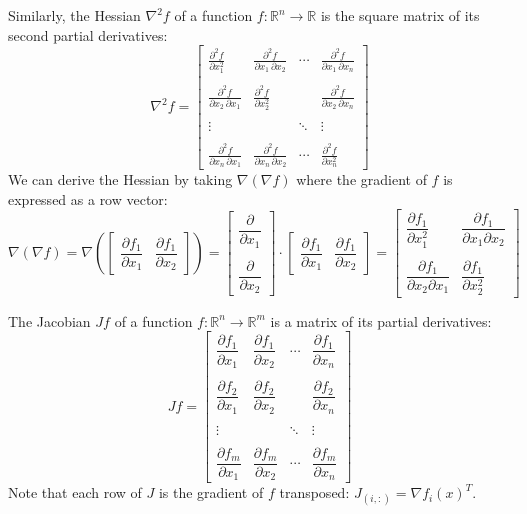 \documentclass{article}
\begin{document}
Similarly, the Hessian $\nabla ^2 f$ of a function $ f: \mathbb{R}^n \longrightarrow \mathbb{R} $
is the square matrix of its second partial derivatives:
\[
    \nabla ^2 f =
    \begin{bmatrix}
        \frac{\partial^2 f}{\partial x_1^2} & \frac{\partial^2 f}{\partial x_1\,\partial x_2} & \cdots & \frac{\partial^2 f}{\partial x_1\,\partial x_n} \\ \\
        \frac{\partial^2 f}{\partial x_2\,\partial x_1} & \frac{\partial^2 f}{\partial x_2^2} &  & \frac{\partial^2 f}{\partial x_2\,\partial x_n} \\ \\
        \vdots &   & \ddots & \vdots \\ \\
        \frac{\partial^2 f}{\partial x_n\,\partial x_1} & \frac{\partial^2 f}{\partial x_n\,\partial x_2} & \cdots & \frac{\partial^2 f}{\partial x_n^2}
    \end{bmatrix}
\]
We can derive the Hessian by taking $\nabla(\nabla f)$ where the gradient of $f$ is expressed as a row vector:
\[
    \nabla(\nabla f) = \nabla (
    \begin{bmatrix}
        \dfrac{\partial f_1}{\partial x_1} & \dfrac{\partial f_1}{\partial x_2}
    \end{bmatrix}) =
    \begin{bmatrix}
        \dfrac{\partial }{\partial x_1} \\ \\
        \dfrac{\partial }{\partial x_2}
    \end{bmatrix} \cdot
    \begin{bmatrix}
        \dfrac{\partial f_1}{\partial x_1} & \dfrac{\partial f_1}{\partial x_2}
    \end{bmatrix} =
    \begin{bmatrix}
        \dfrac{\partial f_1}{\partial x_1^2} & \dfrac{\partial f_1}{\partial x_1 \partial x_2} \\ \\
        \dfrac{\partial f_1}{\partial x_2 \partial x_1} & \dfrac{\partial f_1}{\partial x_2^2}
    \end{bmatrix}
\]


The Jacobian $J f$ of a function $ f: \mathbb{R}^n \longrightarrow \mathbb{R}^m $
is a matrix of its partial derivatives:
\[
    Jf=
    \begin{bmatrix}
        \dfrac{\partial f_1}{\partial x_1} & \dfrac{\partial f_1}{\partial x_2} & \cdots & \dfrac{\partial f_1}{\partial x_n} \\ \\
        \dfrac{\partial f_2}{\partial x_1} & \dfrac{\partial f_2}{\partial x_2} &   & \dfrac{\partial f_2}{\partial x_n} \\ \\
        \vdots &  & \ddots & \vdots \\ \\
        \dfrac{\partial f_m}{\partial x_1} & \dfrac{\partial f_m}{\partial x_2} & \cdots & \dfrac{\partial f_m}{\partial x_n}
    \end{bmatrix}
\]
Note that each row of $J$ is the gradient of $f$ transposed: $J_{(i, :)} = \nabla f_i(x)^T$.
\end{document}
